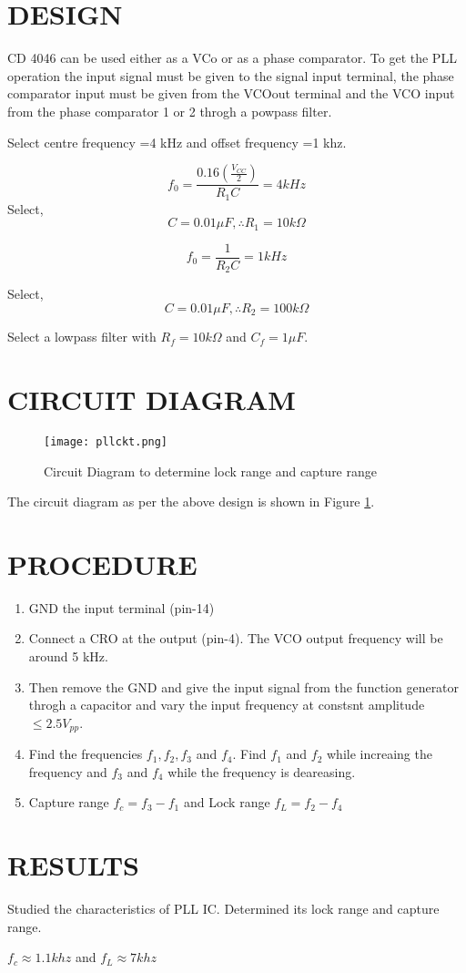 \section*{DESIGN}

CD 4046 can be used either as a VCo or as a phase comparator. To get the PLL operation the input signal must be given to the signal input terminal, the phase comparator input must be given from the VCOout terminal and the VCO input from the phase comparator 1 or 2 throgh a powpass filter. 

Select centre frequency =4 kHz and offset frequency =1 khz. 

\begin{equation}
f_0=\frac{0.16(\frac{V_{CC}}{2})}{R_1 C}=4 kHz
\end{equation}
Select,
\begin{equation}
C=0.01 \mu F, \therefore R_1=10k \Omega
\end{equation}

\begin{equation}
f_0= \frac{1}{R_2 C}=1 kHz
\end{equation}

Select,
\begin{equation}
C=0.01 \mu F, \therefore R_2=100k \Omega
\end{equation}

Select a lowpass filter with $R_f=10k\Omega$ and $C_f=1 \mu F$.
\section*{CIRCUIT DIAGRAM}
\begin{figure}
    \texttt{[image: pllckt.png]}
    \caption{Circuit Diagram to determine lock range and capture range}
    \label{pllckt}
\end{figure}


The circuit diagram as per the above design is shown in Figure 
\ref{pllckt}.

\section*{PROCEDURE}
\begin{enumerate}
\item
GND the input terminal (pin-14)
\item
Connect a CRO at the output (pin-4). The VCO output frequency will be around 5 kHz.
\item
Then remove the GND and give the input signal from the function generator throgh a capacitor and vary the input frequency at constsnt amplitude $\le 2.5 V_{pp}$.
\item
Find the frequencies $f_1, f_2, f_3$ and $f_4$.  Find $f_1$ and $f_2$ while increaing the frequency and $f_3$ and $f_4$ while the frequency is deareasing.
\item
Capture range $f_c= f_3-f_1$ and Lock range $f_L= f_2-f_4$
\end{enumerate}

\section*{RESULTS}

Studied the characteristics of PLL IC. Determined its lock range and capture range.

$f_c \approx 1.1 khz$ and $f_L \approx 7 khz$


